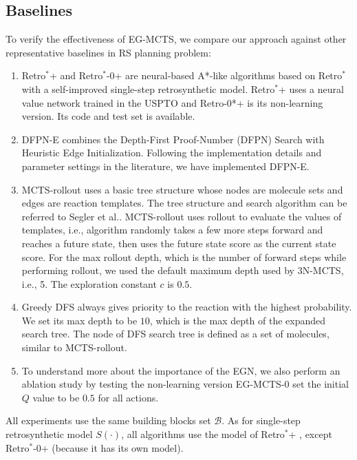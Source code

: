 \documentclass[sn-mathphys,Numbered]{sn-jnl}
\begin{document}
\subsection{Baselines}
To verify the effectiveness of EG-MCTS, we compare our approach against other representative baselines in RS planning problem: 
\begin{enumerate}
    \item Retro$^*$+ and Retro$^*$-0+ \citep{2022} are neural-based A*-like algorithms based on Retro$^*$ \citep{retro2020} with a self-improved single-step retrosynthetic model. Retro$^*$+ uses a neural value network trained in the USPTO and Retro-0*+ is its  non-learning version. Its code and test set is available.
    \item DFPN-E \citep{DFPN-E2019} combines the Depth-First Proof-Number (DFPN) Search with Heuristic Edge Initialization. Following the implementation details and parameter settings in the literature, we have implemented DFPN-E. 
    \item MCTS-rollout uses a basic tree structure whose nodes are molecule sets and edges are reaction templates. The tree structure and search algorithm can be referred to Segler et al.\citet{segler2018}. MCTS-rollout uses rollout to evaluate the values of templates, i.e., algorithm randomly takes a few more steps forward and reaches a future state, then uses the future state score as the current state score. For the max rollout depth, which is the number of forward steps while performing rollout, we used the default maximum depth used by 3N-MCTS, i.e., 5. The exploration constant $c$ is $0.5$.
    \item Greedy DFS always gives priority to the reaction with the highest probability. We set its max depth to be $10$, which is the max depth of the expanded search tree. The node of DFS search tree is defined as a set of molecules, similar to MCTS-rollout. 
    \item To understand more about the importance of the EGN, we also perform an ablation study by testing the non-learning version EG-MCTS-0 set the initial $Q$ value to be $0.5$ for all actions.
    
\end{enumerate}




All experiments use the same building blocks set $\mathcal{B}$. As for single-step retrosynthetic model $S(\cdot)$, all algorithms use the model of Retro$^*$+ \citep{2022}, except Retro$^*$-0+ (because it has its own model).
\end{document}
